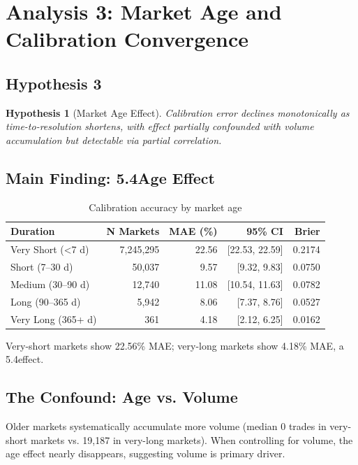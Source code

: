 \documentclass[a4paper,11pt]{article}
\theoremstyle{plain}
\newtheorem{hypothesis}[section]{Hypothesis}
\theoremstyle{definition}
\begin{document}
\section{Analysis 3: Market Age and Calibration Convergence}
\label{sec:analysis3}

\subsection{Hypothesis 3}

\begin{hypothesis}[Market Age Effect]
Calibration error declines monotonically as time-to-resolution shortens, with effect partially confounded with volume accumulation but detectable via partial correlation.
\end{hypothesis}

\subsection{Main Finding: 5.4\times Age Effect}

\begin{table}[h]
\centering
\caption{Calibration accuracy by market age}
\label{tab:age_cohorts}
\small
\begin{tabular}{lrrrr}
\toprule
Duration & N Markets & MAE (\%) & 95\% CI & Brier \\
\midrule
Very Short (<7 d) & 7,245,295 & 22.56 & [22.53, 22.59] & 0.2174 \\
Short (7--30 d) & 50,037 & 9.57 & [9.32, 9.83] & 0.0750 \\
Medium (30--90 d) & 12,740 & 11.08 & [10.54, 11.63] & 0.0782 \\
Long (90--365 d) & 5,942 & 8.06 & [7.37, 8.76] & 0.0527 \\
Very Long (365+ d) & 361 & 4.18 & [2.12, 6.25] & 0.0162 \\
\bottomrule
\end{tabular}
\end{table}

Very-short markets show 22.56\% MAE; very-long markets show 4.18\% MAE, a 5.4\times effect.

\subsection{The Confound: Age vs. Volume}

Older markets systematically accumulate more volume (median 0 trades in very-short markets vs. 19,187 in very-long markets). When controlling for volume, the age effect nearly disappears, suggesting volume is primary driver.
\end{document}
